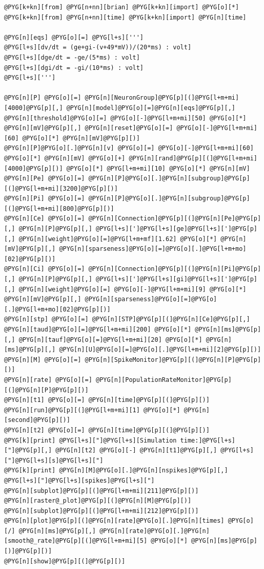 \documentclass[letterpaper,10pt,english]{manual}
\begin{document}
\begin{Verbatim}[commandchars=@\[\]]
@PYG[k+kn][from] @PYG[n+nn][brian] @PYG[k+kn][import] @PYG[o][*]
@PYG[k+kn][from] @PYG[n+nn][time] @PYG[k+kn][import] @PYG[n][time]

@PYG[n][eqs] @PYG[o][=] @PYG[l+s][''']
@PYG[l+s][dv/dt = (ge+gi-(v+49*mV))/(20*ms) : volt]
@PYG[l+s][dge/dt = -ge/(5*ms) : volt]
@PYG[l+s][dgi/dt = -gi/(10*ms) : volt]
@PYG[l+s][''']

@PYG[n][P] @PYG[o][=] @PYG[n][NeuronGroup]@PYG[p][(]@PYG[l+m+mi][4000]@PYG[p][,] @PYG[n][model]@PYG[o][=]@PYG[n][eqs]@PYG[p][,] @PYG[n][threshold]@PYG[o][=] @PYG[o][-]@PYG[l+m+mi][50] @PYG[o][*] @PYG[n][mV]@PYG[p][,] @PYG[n][reset]@PYG[o][=] @PYG[o][-]@PYG[l+m+mi][60] @PYG[o][*] @PYG[n][mV]@PYG[p][)]
@PYG[n][P]@PYG[o][.]@PYG[n][v] @PYG[o][=] @PYG[o][-]@PYG[l+m+mi][60] @PYG[o][*] @PYG[n][mV] @PYG[o][+] @PYG[n][rand]@PYG[p][(]@PYG[l+m+mi][4000]@PYG[p][)] @PYG[o][*] @PYG[l+m+mi][10] @PYG[o][*] @PYG[n][mV]
@PYG[n][Pe] @PYG[o][=] @PYG[n][P]@PYG[o][.]@PYG[n][subgroup]@PYG[p][(]@PYG[l+m+mi][3200]@PYG[p][)]
@PYG[n][Pi] @PYG[o][=] @PYG[n][P]@PYG[o][.]@PYG[n][subgroup]@PYG[p][(]@PYG[l+m+mi][800]@PYG[p][)]
@PYG[n][Ce] @PYG[o][=] @PYG[n][Connection]@PYG[p][(]@PYG[n][Pe]@PYG[p][,] @PYG[n][P]@PYG[p][,] @PYG[l+s][']@PYG[l+s][ge]@PYG[l+s][']@PYG[p][,] @PYG[n][weight]@PYG[o][=]@PYG[l+m+mf][1.62] @PYG[o][*] @PYG[n][mV]@PYG[p][,] @PYG[n][sparseness]@PYG[o][=]@PYG[o][.]@PYG[l+m+mo][02]@PYG[p][)]
@PYG[n][Ci] @PYG[o][=] @PYG[n][Connection]@PYG[p][(]@PYG[n][Pi]@PYG[p][,] @PYG[n][P]@PYG[p][,] @PYG[l+s][']@PYG[l+s][gi]@PYG[l+s][']@PYG[p][,] @PYG[n][weight]@PYG[o][=] @PYG[o][-]@PYG[l+m+mi][9] @PYG[o][*] @PYG[n][mV]@PYG[p][,] @PYG[n][sparseness]@PYG[o][=]@PYG[o][.]@PYG[l+m+mo][02]@PYG[p][)]
@PYG[n][stp] @PYG[o][=] @PYG[n][STP]@PYG[p][(]@PYG[n][Ce]@PYG[p][,] @PYG[n][taud]@PYG[o][=]@PYG[l+m+mi][200] @PYG[o][*] @PYG[n][ms]@PYG[p][,] @PYG[n][tauf]@PYG[o][=]@PYG[l+m+mi][20] @PYG[o][*] @PYG[n][ms]@PYG[p][,] @PYG[n][U]@PYG[o][=]@PYG[o][.]@PYG[l+m+mi][2]@PYG[p][)]
@PYG[n][M] @PYG[o][=] @PYG[n][SpikeMonitor]@PYG[p][(]@PYG[n][P]@PYG[p][)]
@PYG[n][rate] @PYG[o][=] @PYG[n][PopulationRateMonitor]@PYG[p][(]@PYG[n][P]@PYG[p][)]
@PYG[n][t1] @PYG[o][=] @PYG[n][time]@PYG[p][(]@PYG[p][)]
@PYG[n][run]@PYG[p][(]@PYG[l+m+mi][1] @PYG[o][*] @PYG[n][second]@PYG[p][)]
@PYG[n][t2] @PYG[o][=] @PYG[n][time]@PYG[p][(]@PYG[p][)]
@PYG[k][print] @PYG[l+s]["]@PYG[l+s][Simulation time:]@PYG[l+s]["]@PYG[p][,] @PYG[n][t2] @PYG[o][-] @PYG[n][t1]@PYG[p][,] @PYG[l+s]["]@PYG[l+s][s]@PYG[l+s]["]
@PYG[k][print] @PYG[n][M]@PYG[o][.]@PYG[n][nspikes]@PYG[p][,] @PYG[l+s]["]@PYG[l+s][spikes]@PYG[l+s]["]
@PYG[n][subplot]@PYG[p][(]@PYG[l+m+mi][211]@PYG[p][)]
@PYG[n][raster@_plot]@PYG[p][(]@PYG[n][M]@PYG[p][)]
@PYG[n][subplot]@PYG[p][(]@PYG[l+m+mi][212]@PYG[p][)]
@PYG[n][plot]@PYG[p][(]@PYG[n][rate]@PYG[o][.]@PYG[n][times] @PYG[o][/] @PYG[n][ms]@PYG[p][,] @PYG[n][rate]@PYG[o][.]@PYG[n][smooth@_rate]@PYG[p][(]@PYG[l+m+mi][5] @PYG[o][*] @PYG[n][ms]@PYG[p][)]@PYG[p][)]
@PYG[n][show]@PYG[p][(]@PYG[p][)]
\end{Verbatim}
\end{document}
